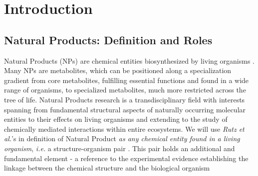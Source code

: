 \documentclass[
11pt, %
oneside, %
english, %
singlespacing, %
headsepline, %
chapterinoneline, %
]{MastersDoctoralThesis} %
\begin{document}



\mainmatter %

\pagestyle{thesis} %


%
% 
%
% 
% 
%

\chapter{Introduction}\label{chap:intro}

\section{Natural Products: Definition and Roles}\label{sec:NP def and roles}
Natural Products (NPs) are chemical entities biosynthesized by living organisms \cite{AllNatural2007}. Many NPs are metabolites, which can be positioned along a specialization gradient from core metabolites, fulfilling essential functions and found in a wide range of organisms, to specialized metabolites, much more restricted across the tree of life. Natural Products research is a transdisciplinary field with interests spanning from fundamental structural aspects of naturally occurring molecular entities to their effects on living organisms and extending to the study of chemically mediated interactions within entire ecosystems. We will use \textit{Rutz et al.}'s in definition of Natural Product \textit{as any chemical entity found in a living organism}, \textit{i.e.} a structure-organism pair \cite{rutzLOTUSInitiativeOpen2022}. This pair holds an additional and fundamental element - a reference to the experimental evidence establishing the linkage between the chemical structure and the biological organism
\end{document}
